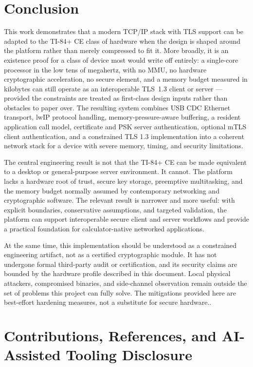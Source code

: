 \documentclass[titlepage]{report}
\begin{document}
	
		\newpage
		
		\section{Conclusion}
		This work demonstrates that a modern TCP/IP stack with TLS support can be adapted to the TI-84+ CE class of hardware when the design is shaped around the platform rather than merely compressed to fit it. More broadly, it is an existence proof for a class of device most would write off entirely: a single-core processor in the low tens of megahertz, with no MMU, no hardware cryptographic acceleration, no secure element, and a memory budget measured in kilobytes can still operate as an interoperable TLS~1.3 client or server --- provided the constraints are treated as first-class design inputs rather than obstacles to paper over. The resulting system combines USB CDC Ethernet transport, lwIP protocol handling, memory-pressure-aware buffering, a resident application call model, certificate and PSK server authentication, optional mTLS client authentication, and a constrained TLS 1.3 implementation into a coherent network stack for a device with severe memory, timing, and security limitations.
		
		The central engineering result is not that the TI-84+ CE can be made equivalent to a desktop or general-purpose server environment. It cannot. The platform lacks a hardware root of trust, secure key storage, preemptive multitasking, and the memory budget normally assumed by contemporary networking and cryptographic software. The relevant result is narrower and more useful: with explicit boundaries, conservative assumptions, and targeted validation, the platform can support interoperable secure client and server workflows and provide a practical foundation for calculator-native networked applications.
		
		At the same time, this implementation should be understood as a constrained engineering artifact, not as a certified cryptographic module. It has not undergone formal third-party audit or certification, and its security claims are bounded by the hardware profile described in this document. Local physical attackers, compromised binaries, and side-channel observation remain outside the set of problems this project can fully solve. The mitigations provided here are best-effort hardening measures, not a substitute for secure hardware..

	\newpage
	\section{Contributions, References, and AI-Assisted Tooling Disclosure}\small
\end{document}
